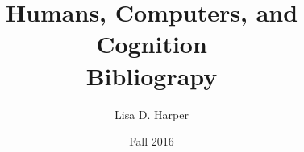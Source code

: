 \documentclass[12pt]{article}
\begin{document}
\title{Humans, Computers, and Cognition \\ Bibliograpy}
\author{Lisa D. Harper}
\date{Fall 2016}
\maketitle

\renewcommand{\clearpage}{} %




\end{document}
